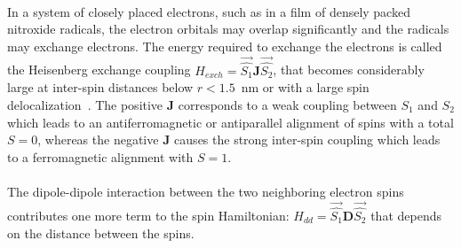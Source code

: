 \paragraph*{}
In a system of closely placed electrons, such as in a film of densely packed nitroxide radicals, the electron orbitals may overlap significantly and the radicals may exchange electrons. The energy required to exchange the electrons is called the Heisenberg exchange coupling $H_{exch} = \vec{\hat{S_1}}\textbf{J}\vec{\hat{S_2}}$, that becomes considerably large at inter-spin distances below $r<1.5$~nm or with a large spin delocalization~\cite{Schweiger2001_exch}. The positive $\textbf{J}$ corresponds to a weak coupling between $S_1$ and $S_2$ which leads to an antiferromagnetic or antiparallel alignment of spins with a total $S=0$, whereas the negative $\textbf{J}$ causes the strong inter-spin coupling which leads to a ferromagnetic alignment with $S=1$.

\paragraph*{}
The dipole-dipole interaction between the two neighboring electron spins contributes one more term to the spin Hamiltonian: $H_{dd} = \vec{\hat{S_1}}\textbf{D}\vec{\hat{S_2}}$ that depends on the distance between the spins. 


 